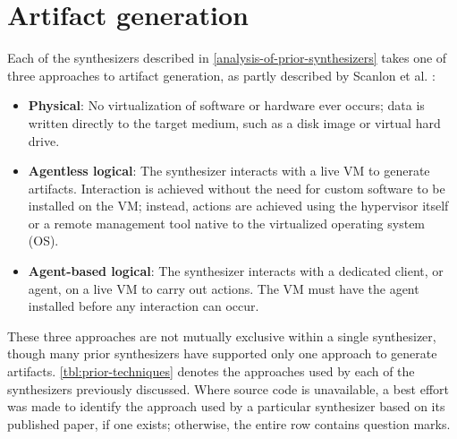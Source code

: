 \documentclass[final,5p,times,twocolumn]{elsarticle}
\begin{document}
\section{Artifact generation}\label{artifact-generation}

Each of the synthesizers described in \autoref{analysis-of-prior-synthesizers} takes one of three approaches to artifact generation, as
partly described by Scanlon et al.
\citep{scanlonEviPlantEfficientDigital2017}:

\begin{itemize}
\item
  \textbf{Physical}: No virtualization of software or hardware ever
  occurs; data is written directly to the target medium, such as a disk
  image or virtual hard drive.
\item
  \textbf{Agentless logical}: The synthesizer interacts with a live VM
  to generate artifacts. Interaction is achieved without the need for
  custom software to be installed on the VM; instead, actions are
  achieved using the hypervisor itself or a remote management tool
  native to the virtualized operating system (OS).
\item
  \textbf{Agent-based logical}: The synthesizer interacts with a
  dedicated client, or agent, on a live VM to carry out actions. The VM
  must have the agent installed before any interaction can occur.
\end{itemize}

These three approaches are not mutually exclusive within a single
synthesizer, though many prior synthesizers have supported only one
approach to generate artifacts. \autoref{tbl:prior-techniques} denotes
the approaches used by each of the synthesizers previously discussed.
Where source code is unavailable, a best effort was made to identify the
approach used by a particular synthesizer based on its published paper,
if one exists; otherwise, the entire row contains question marks.
\end{document}

